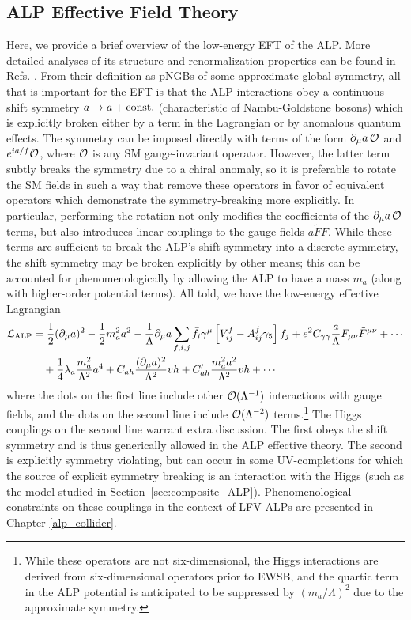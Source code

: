 {\subsection{ALP Effective Field Theory}\label{sec:ALP_EFT}
Here, we provide a brief overview of the low-energy EFT of the ALP. More detailed analyses of its structure and renormalization properties can be found in Refs. \cite{Georgi:1986df,Bauer:2017ris,Bauer:2020jbp,Bauer:2021mvw}. From their definition as pNGBs of some approximate global symmetry, all that is important for the EFT is that the ALP interactions obey a continuous shift symmetry $a \rightarrow a + {\rm const.}$ (characteristic of Nambu-Goldstone bosons) which is explicitly broken either by a term in the Lagrangian or by anomalous quantum effects. The symmetry can be imposed directly with terms of the form $\partial_\mu a\, {\cal O}$ and $e^{ia/f}{\cal O}$, where ${\cal O}$ is any SM gauge-invariant operator. However, the latter term subtly breaks the symmetry due to a chiral anomaly, so it is preferable to rotate the SM fields in such a way that remove these operators in favor of equivalent operators which demonstrate the symmetry-breaking more explicitly. In particular, performing the rotation not only modifies the coefficients of the $\partial_\mu a\,{\cal O}$ terms, but also introduces linear couplings to the gauge fields $a{\tilde F}F$. While these terms are sufficient to break the ALP's shift symmetry into a discrete symmetry, the shift symmetry may be broken explicitly by other means; this can be accounted for phenomenologically by allowing the ALP to have a mass $m_a$ (along with higher-order potential terms). All told, we have the low-energy effective Lagrangian \cite{Georgi:1986df,Bauer:2021mvw}
\begin{align}
    {\cal L}_{\rm ALP} &= \frac{1}{2}(\partial_\mu a)^2 - \frac{1}{2}m_a^2 a^2 - \frac{1}{\Lambda}\partial_\mu a\sum_{f,i,j}\bar{f}_i\gamma^\mu\left[V_{ij}^f - A_{ij}^f\gamma_5\right]f_j+ e^2 C_{\gamma\gamma}\frac{a}{\Lambda}F_{\mu\nu}\tilde{F}^{\mu\nu} + \cdots \nonumber\\
    &\ \ \ + \frac{1}{4}\lambda_a \frac{m_a^2}{\Lambda^2}a^4+ C_{ah}\frac{(\partial_\mu a)^2}{\Lambda^2}vh + C_{ah}'\frac{m_a^2 a^2}{\Lambda^2}vh + \cdots \label{eq:ALP_EFT}
\end{align}
where the dots on the first line include other ${\cal O}(\Lambda^{-1})$ interactions with gauge fields, and the dots on the second line include ${\cal O}(\Lambda^{-2})$ terms.\footnote{While these operators are not six-dimensional, the Higgs interactions are derived from six-dimensional operators prior to EWSB, and the quartic term in the ALP potential is anticipated to be suppressed by $(m_a/\Lambda)^2$ due to the approximate symmetry.} The Higgs couplings on the second line warrant extra discussion. The first obeys the shift symmetry and is thus generically allowed in the ALP effective theory. The second is explicitly symmetry violating, but can occur in some UV-completions for which the source of explicit symmetry breaking is an interaction with the Higgs (such as the model studied in Section~\ref{sec:composite_ALP}). Phenomenological constraints on these couplings in the context of LFV ALPs are presented in Chapter {\ref{alp_collider}}.

}
